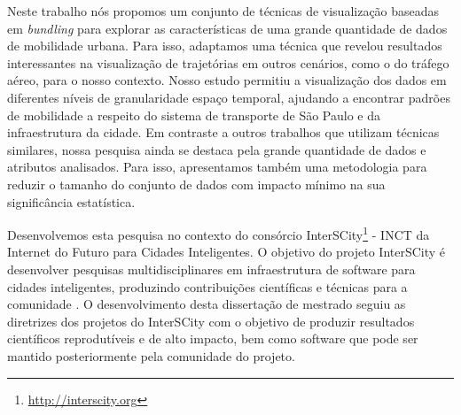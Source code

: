 Neste trabalho nós propomos um conjunto de técnicas de visualização
baseadas em \emph{bundling} para explorar as características de uma grande
quantidade de dados de mobilidade urbana. Para isso, adaptamos uma técnica
que revelou resultados interessantes na visualização de trajetórias em outros
cenários, como o do tráfego aéreo, para o nosso contexto. Nosso estudo permitiu
a visualização dos dados em diferentes níveis de granularidade espaço temporal,
ajudando a encontrar padrões de mobilidade a respeito do sistema de transporte
de S\~ao Paulo e da infraestrutura da cidade. Em contraste a outros trabalhos
que utilizam técnicas similares, nossa pesquisa ainda se destaca pela grande
quantidade de dados e atributos analisados. Para isso, apresentamos também uma
metodologia para reduzir o tamanho do conjunto de dados com impacto mínimo na
sua significância estatística.

Desenvolvemos esta pesquisa no contexto do consórcio
InterSCity\footnote{\url{http://interscity.org}} - INCT da Internet do Futuro
para Cidades Inteligentes. O objetivo do projeto InterSCity é desenvolver
pesquisas multidisciplinares em infraestrutura de software para cidades
inteligentes, produzindo contribuições científicas e técnicas para a comunidade
\citep{Daniel2016}. O desenvolvimento desta dissertação de mestrado seguiu as
diretrizes dos projetos do InterSCity com o objetivo de produzir resultados
científicos reprodutíveis e de alto impacto, bem como software 
que pode ser mantido posteriormente pela comunidade do projeto.
